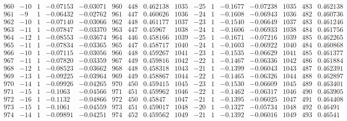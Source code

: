 \documentclass[11pt,reqno,a4letter]{article}
\numberwithin{figure}{section}
\numberwithin{table}{section}
\theoremstyle{plain}
\numberwithin{theorem}{section}
\theoremstyle{definition}
\begin{document}
\begin{table}[ht]
\begin{equation*}
{\begin{array}{ccccc|ccc|ccccc|ccc}
 960 & -10 & 1 & -0.07153 & -0.03071 & 960 & 448 & 0.462138 & 1035 & -25 & 1 & -0.1677 & -0.07238 & 1035 & 483 & 0.462138 \\
 961 & -9 & 1 & -0.06432 & -0.02762 & 961 & 447 & 0.460626 & 1036 & -24 & 1 & -0.1608 & -0.06943 & 1036 & 482 & 0.460736 \\
 962 & -10 & 1 & -0.07140 & -0.03066 & 962 & 448 & 0.461177 & 1037 & -23 & 1 & -0.1540 & -0.06649 & 1037 & 483 & 0.461246 \\
 963 & -11 & 1 & -0.07847 & -0.03370 & 963 & 447 & 0.45967 & 1038 & -24 & 1 & -0.1606 & -0.06933 & 1038 & 484 & 0.461756 \\
 964 & -12 & 1 & -0.08553 & -0.03674 & 964 & 446 & 0.458166 & 1039 & -25 & 1 & -0.1671 & -0.07216 & 1039 & 485 & 0.462265 \\
 965 & -11 & 1 & -0.07834 & -0.03365 & 965 & 447 & 0.458717 & 1040 & -24 & 1 & -0.1603 & -0.06922 & 1040 & 484 & 0.460868 \\
 966 & -10 & 1 & -0.07115 & -0.03056 & 966 & 448 & 0.459267 & 1041 & -23 & 1 & -0.1535 & -0.06629 & 1041 & 485 & 0.461377 \\
 967 & -11 & 1 & -0.07820 & -0.03359 & 967 & 449 & 0.459816 & 1042 & -22 & 1 & -0.1467 & -0.06336 & 1042 & 486 & 0.461884 \\
 968 & -12 & 1 & -0.08523 & -0.03662 & 968 & 448 & 0.458318 & 1043 & -21 & 1 & -0.1399 & -0.06043 & 1043 & 487 & 0.462391 \\
 969 & -13 & 1 & -0.09225 & -0.03964 & 969 & 449 & 0.458867 & 1044 & -22 & 1 & -0.1465 & -0.06326 & 1044 & 488 & 0.462897 \\
 970 & -14 & 1 & -0.09926 & -0.04265 & 970 & 450 & 0.459415 & 1045 & -23 & 1 & -0.1530 & -0.06609 & 1045 & 489 & 0.463401 \\
 971 & -15 & 1 & -0.1063 & -0.04566 & 971 & 451 & 0.459962 & 1046 & -22 & 1 & -0.1462 & -0.06317 & 1046 & 490 & 0.463905 \\
 972 & -16 & 1 & -0.1132 & -0.04866 & 972 & 450 & 0.45847 & 1047 & -21 & 1 & -0.1395 & -0.06025 & 1047 & 491 & 0.464408 \\
 973 & -15 & 1 & -0.1061 & -0.04559 & 973 & 451 & 0.459017 & 1048 & -20 & 1 & -0.1327 & -0.05734 & 1048 & 492 & 0.46491 \\
 974 & -14 & 1 & -0.09891 & -0.04251 & 974 & 452 & 0.459562 & 1049 & -21 & 1 & -0.1392 & -0.06016 & 1049 & 493 & 0.46541 \\
\end{array} 
}
\end{equation*} 
\clearpage 

\end{table} 
\end{document}

